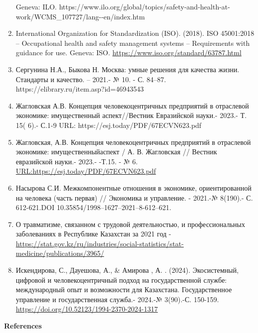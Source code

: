 \begin{references}
\begin{enumerate}
  Geneva: ILO.
  https://www.ilo.org/global/topics/safety-and-health-at-work/WCMS\_107727/lang-\/-en/index.htm
\item
  International Organization for Standardization (ISO). (2018). ISO
  45001:2018 -- Occupational health and safety management systems --
  Requirements with guidance for use. Geneva: ISO.
  \url{https://www.iso.org/standard/63787.html}
\item
  Сергунина Н.А., Быкова Н. Москва: умные решения для качества жизни.
  Стандарты и качество. -- 2021.- № 10. - С. 84--87.
  https://elibrary.ru/item.asp?id=46943543
\item
  Жагловская А.В. Концепция человекоцентричных предприятий в отраслевой
  экономике: имущественный аспект//Вестник Евразийской науки.- 2023.- Т.
  15( 6).- С.1-9 URL: https://esj.today/PDF/67ECVN623.pdf
\item
  Жагловская, А.В. Концепция человекоцентричных предприятий в отраслевой
  экономике: имущественныйаспект / А. В. Жагловская // Вестник
  евразийской науки.- 2023.- -Т.15. - № 6.
  \url{URL:https://esj.today/PDF/67ECVN623.pdf}
\item
  Насырова С.И. Межкомпонентные отношения в экономике, ориентированной
  на человека (часть первая) // Экономика и управление. - 2021.-№
  8(190).- С. 612-621.DOI 10.35854/1998--1627--2021--8-612--621.
\item
  О травматизме, связанном с трудовой деятельностью, и профессиональных
  заболеваниях в Республике Казахстан за 2021 год -
  \url{https://stat.gov.kz/ru/industries/social-statistics/stat-medicine/publications/3965/}
\item
  Искендирова, С., Дауешова, А., \& Амирова , А. . (2024). Экосистемный,
  цифровой и человекоцентричный подход на государственной службе:
  международный опыт и возможности для Казахстана. Государственное
  управление и государственная служба.- 2024.-№ 3(90).-С. 150-159.
  \url{https://doi.org/10.52123/1994-2370-2024-1317}
\end{enumerate}
\end{references}
\begin{center}

{\bfseries References}

\end{center}
